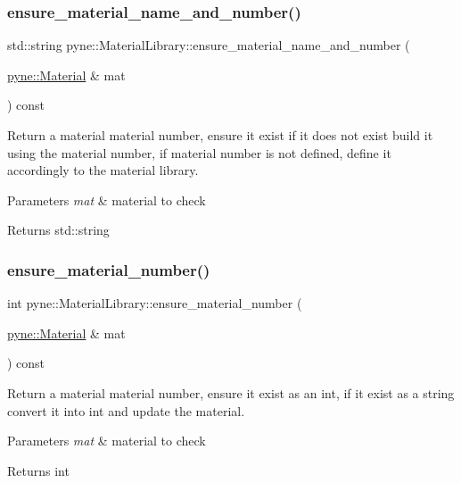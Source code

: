\subsubsection{\texorpdfstring{ensure\+\_\+material\+\_\+name\+\_\+and\+\_\+number()}{ensure\_material\_name\_and\_number()}}
{\footnotesize\ttfamily std\+::string pyne\+::\+Material\+Library\+::ensure\+\_\+material\+\_\+name\+\_\+and\+\_\+number (\begin{DoxyParamCaption}\item[{\hyperlink{classpyne_1_1_material}{pyne\+::\+Material} \&}]{mat }\end{DoxyParamCaption}) const}



Return a material material number, ensure it exist if it does not exist build it using the material number, if material number is not defined, define it accordingly to the material library. 


\begin{DoxyParams}{Parameters}
{\em mat} & material to check \\
\hline
\end{DoxyParams}
\begin{DoxyReturn}{Returns}
std\+::string 
\end{DoxyReturn}
\mbox{\label{classpyne_1_1_material_library_a9fd496f65788d0fb140ebdd59163aa34}} 
\subsubsection{\texorpdfstring{ensure\+\_\+material\+\_\+number()}{ensure\_material\_number()}}
{\footnotesize\ttfamily int pyne\+::\+Material\+Library\+::ensure\+\_\+material\+\_\+number (\begin{DoxyParamCaption}\item[{\hyperlink{classpyne_1_1_material}{pyne\+::\+Material} \&}]{mat }\end{DoxyParamCaption}) const}



Return a material material number, ensure it exist as an int, if it exist as a string convert it into int and update the material. 


\begin{DoxyParams}{Parameters}
{\em mat} & material to check \\
\hline
\end{DoxyParams}
\begin{DoxyReturn}{Returns}
int 
\end{DoxyReturn}
\mbox{\label{classpyne_1_1_material_library_ae6e7c80567660b1dae6f1fcc30c31b83}} 
